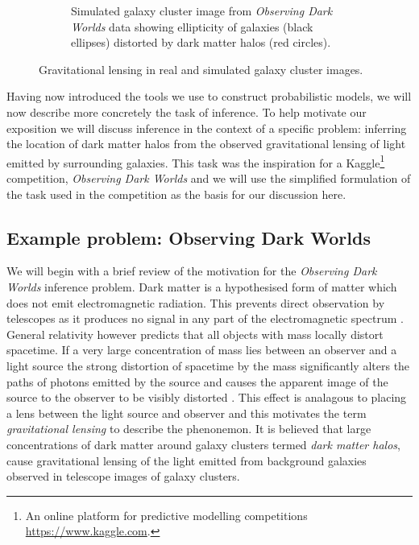 \begin{figure}[!t]
\begin{subfigure}[b]{.46\linewidth}
\vskip 0pt
\caption{Simulated galaxy cluster image from \emph{Observing Dark Worlds} data \citep{kaggle2012observing} showing ellipticity of galaxies (black ellipses) distorted by dark matter halos (red circles).}
\label{sfig:gravitational-lensing-simulated}
\end{subfigure}%
\caption[Examples of gravitational lensing.]{Gravitational lensing in real and simulated galaxy cluster images.}
\label{fig:gravitational-lensing}
\end{figure}

Having now introduced the tools we use to construct probabilistic models, we will now describe more concretely the task of inference. To help motivate our exposition we will discuss inference in the context of a specific problem: inferring the location of dark matter halos from the observed gravitational lensing of light emitted by surrounding galaxies. This task was the inspiration for a Kaggle\footnote{An online platform for predictive modelling competitions \url{https://www.kaggle.com}.} competition, \emph{Observing Dark Worlds} \citep{kaggle2012observing,harvey2014observing} and we will use the simplified formulation of the task used in the competition as the basis for our discussion here.%

\subsection{Example problem: Observing Dark Worlds}

We will begin with a brief review of the motivation for the \emph{Observing Dark Worlds} inference problem. Dark matter is a hypothesised form of matter which does not emit electromagnetic radiation.  This prevents direct observation by telescopes as it produces no signal in any part of the electromagnetic spectrum \citep{massey2010dark}. General relativity however predicts that all objects with mass locally distort spacetime. If a very large concentration of mass lies between an observer and a light source the strong distortion of spacetime by the mass significantly alters the paths of photons emitted by the source and causes the apparent image of the source to the observer to be visibly distorted \citep{bartelmann2001weak}. This effect is analagous to placing a lens between the light source and observer and this motivates the term \emph{gravitational lensing} to describe the phenonemon. It is believed that large concentrations of dark matter around galaxy clusters termed \emph{dark matter halos}, cause gravitational lensing of the light emitted from background galaxies observed in telescope images of galaxy clusters. %

